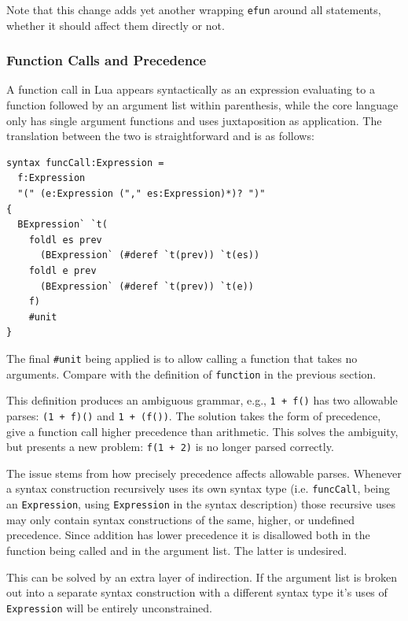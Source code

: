 \documentclass{kththesis}
\begin{document}
Note that this change adds yet another wrapping \texttt{efun} around all statements, whether it should affect them directly or not.

\subsubsection{Function Calls and Precedence} \label{sec:lua-func-call-precedence}

A function call in Lua appears syntactically as an expression evaluating to a function followed by an argument list within parenthesis, while the core language only has single argument functions and uses juxtaposition as application. The translation between the two is straightforward and is as follows:

\begin{verbatim}
syntax funcCall:Expression =
  f:Expression
  "(" (e:Expression ("," es:Expression)*)? ")"
{
  BExpression` `t(
    foldl es prev
      (BExpression` (#deref `t(prev)) `t(es))
    foldl e prev
      (BExpression` (#deref `t(prev)) `t(e))
    f)
    #unit
}
\end{verbatim}

The final \texttt{#unit} being applied is to allow calling a function that takes no arguments. Compare with the definition of \texttt{function} in the previous section. %

This definition produces an ambiguous grammar, e.g., \texttt{1 + f()} has two allowable parses: \texttt{(1 + f)()} and \texttt{1 + (f())}. The solution takes the form of precedence, give a function call higher precedence than arithmetic. This solves the ambiguity, but presents a new problem: \texttt{f(1 + 2)} is no longer parsed correctly.

The issue stems from how precisely precedence affects allowable parses. Whenever a syntax construction recursively uses its own syntax type (i.e. \texttt{funcCall}, being an \texttt{Expression}, using \texttt{Expression} in the syntax description) those recursive uses may only contain syntax constructions of the same, higher, or undefined precedence. Since addition has lower precedence it is disallowed both in the function being called and in the argument list. The latter is undesired.

This can be solved by an extra layer of indirection. If the argument list is broken out into a separate syntax construction with a different syntax type it's uses of \texttt{Expression} will be entirely unconstrained.
\end{document}
